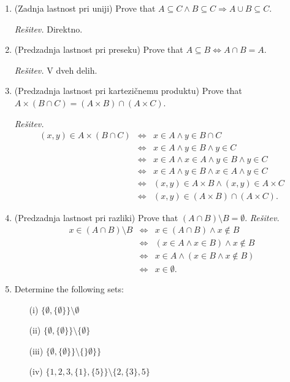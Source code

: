 \documentclass[11pt,paper=b5,footinclude,headinclude]{scrbook} %
\theoremstyle{remark}
\theoremstyle{definition} %
\theoremstyle{theorem} %
\begin{document}
\begin{enumerate}
\item (Zadnja lastnost pri uniji) Prove that $A\subseteq C  \wedge B\subseteq C \Rightarrow A\cup B\subseteq C$.

\emph{ Rešitev.} Direktno.

\item (Predzadnja lastnost pri preseku) Prove that $A\subseteq  B \Leftrightarrow A\cap B = A$.

\emph{ Rešitev.} V dveh delih.

\item (Predzadnja lastnost pri kartezičnemu produktu) Prove that $A\times (B\cap C) = (A\times B)\cap (A\times C)$.

\emph{ Rešitev.} 
\begin{eqnarray*}
(x,y)\in A\times (B\cap C) &\Leftrightarrow & x \in A \wedge y\in B\cap C\\
&\Leftrightarrow & x \in A \wedge y\in B  \wedge y\in C\\
&\Leftrightarrow & x \in A \wedge x \in A\wedge y\in B  \wedge y\in C\\
&\Leftrightarrow & x \in A \wedge  y\in B  \wedge x \in A\wedge y\in C\\
&\Leftrightarrow & (x,y) \in A\times B \wedge  (x,y) \in A\times C\\
&\Leftrightarrow & (x,y) \in (A\times B)\cap   (A\times C).
\end{eqnarray*}

\item (Predzadnja lastnost pri razliki) Prove that $(A\cap B )\setminus B = \emptyset$.
\emph{ Rešitev.} 
\begin{eqnarray*}
x\in (A\cap B )\setminus B  &\Leftrightarrow & x \in (A\cap B)  \wedge x\notin B\\
&\Leftrightarrow & (x\in A\wedge x\in  B ) \wedge x\notin B\\
&\Leftrightarrow & x\in A\wedge (x\in  B  \wedge x\notin B)\\
&\Leftrightarrow & x\in \emptyset.
\end{eqnarray*}

\item Determine the following sets:
\begin{enumerate}
\item[(i)] $\{\emptyset, \{\emptyset\}\}\setminus \emptyset$ \quad [$\{\emptyset, \{\emptyset\}\}$]
\item[(ii)] $\{\emptyset, \{\emptyset\}\}\setminus \{\emptyset\}$
\item[(iii)] $\{\emptyset, \{\emptyset\}\}\setminus \{\}\emptyset\}\}$
\item[(iv)] $\{1,2,3,\{1\}, \{5\}  \}\setminus \{2,\{3\},5\}$
\end{enumerate}


\end{enumerate}
\end{document}
